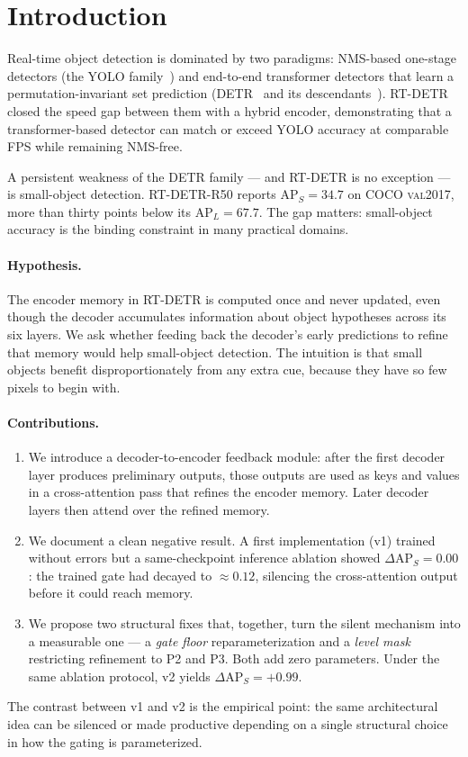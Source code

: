 \section{Introduction}
\label{sec:intro}

Real-time object detection is dominated by two paradigms: NMS-based one-stage detectors (the YOLO family~\cite{redmon2016yolo,wang2023yolov7}) and end-to-end transformer detectors that learn a permutation-invariant set prediction (DETR~\cite{carion2020detr} and its descendants~\cite{zhu2021deformable,liu2022dabdetr,zhang2023dino}). RT-DETR~\cite{lyu2024rtdetr} closed the speed gap between them with a hybrid encoder, demonstrating that a transformer-based detector can match or exceed YOLO accuracy at comparable FPS while remaining NMS-free.

A persistent weakness of the DETR family --- and RT-DETR is no exception --- is small-object detection. RT-DETR-R50 reports $\mathrm{AP}_S = 34.7$ on COCO \textsc{val2017}, more than thirty points below its $\mathrm{AP}_L = 67.7$. The gap matters: small-object accuracy is the binding constraint in many practical domains.

\paragraph{Hypothesis.} The encoder memory in RT-DETR is computed once and never updated, even though the decoder accumulates information about object hypotheses across its six layers. We ask whether feeding back the decoder's early predictions to refine that memory would help small-object detection. The intuition is that small objects benefit disproportionately from any extra cue, because they have so few pixels to begin with.

\paragraph{Contributions.}
\begin{enumerate}
    \item We introduce a decoder-to-encoder feedback module: after the first decoder layer produces preliminary outputs, those outputs are used as keys and values in a cross-attention pass that refines the encoder memory. Later decoder layers then attend over the refined memory.
    \item We document a clean negative result. A first implementation (v1) trained without errors but a same-checkpoint inference ablation showed $\Delta\mathrm{AP}_S = 0.00$: the trained gate had decayed to ${\approx}0.12$, silencing the cross-attention output before it could reach memory.
    \item We propose two structural fixes that, together, turn the silent mechanism into a measurable one --- a \emph{gate floor} reparameterization and a \emph{level mask} restricting refinement to P2 and P3. Both add zero parameters. Under the same ablation protocol, v2 yields $\Delta\mathrm{AP}_S = +0.99$.
\end{enumerate}

The contrast between v1 and v2 is the empirical point: the same architectural idea can be silenced or made productive depending on a single structural choice in how the gating is parameterized.
